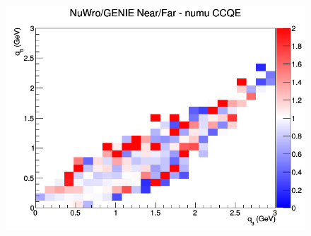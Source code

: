 \begin{figure}[h]
\endminipage
{}
\includegraphics[width=\linewidth]{eff_q0_q3/LAr/ratios/CCQE_NuWro_GENIE_numu_NF_q3_q0.png}
\endminipage
\newline
\end{figure}
\clearpage
